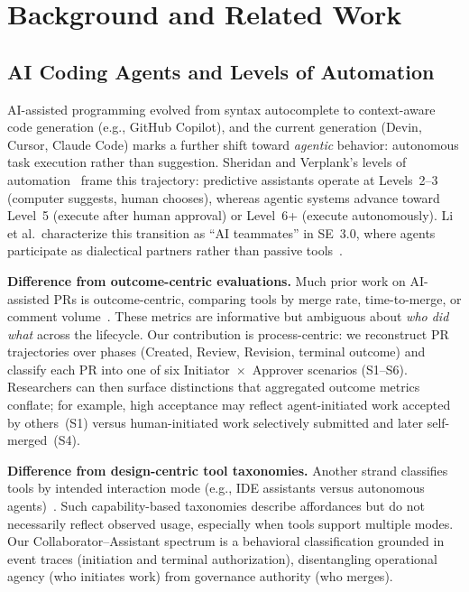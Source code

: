 \documentclass[sigconf]{acmart}
\begin{document}
\section{Background and Related Work}
\label{sec:background}

\subsection{AI Coding Agents and Levels of Automation}

AI-assisted programming evolved from syntax autocomplete to
context-aware code generation (e.g., GitHub Copilot), and the
current generation (Devin, Cursor, Claude Code) marks a further
shift toward \emph{agentic} behavior: autonomous task execution
rather than suggestion.
Sheridan and Verplank's levels of automation~\cite{sheridan1978human}
frame this trajectory: predictive assistants operate at
Levels~2--3 (computer suggests, human chooses), whereas agentic
systems advance toward Level~5 (execute after human approval) or
Level~6+ (execute autonomously).
Li et al.\ characterize this transition as ``AI teammates'' in
SE~3.0, where agents participate as dialectical partners rather
than passive tools~\cite{li2025aiteammates}.

\textbf{Difference from outcome-centric evaluations.}
Much prior work on AI-assisted PRs is outcome-centric, comparing
tools by merge rate, time-to-merge, or comment
volume~\cite{li2025aidev,pinna2026comparing,rahman2026tasklevel}.
These metrics are informative but ambiguous about \emph{who did
what} across the lifecycle.
Our contribution is process-centric: we reconstruct PR
trajectories over phases (Created, Review, Revision, terminal
outcome) and classify each PR into one of six
Initiator~$\times$~Approver scenarios (S1--S6).
Researchers can then surface distinctions that aggregated outcome
metrics conflate; for example, high acceptance may reflect
agent-initiated work accepted by others~(S1) versus
human-initiated work selectively submitted and later
self-merged~(S4).

\textbf{Difference from design-centric tool taxonomies.}
Another strand classifies tools by intended interaction mode
(e.g., IDE assistants versus autonomous
agents)~\cite{li2025aiteammates,agarwal2026ai}.
Such capability-based taxonomies describe affordances but do not
necessarily reflect observed usage, especially when tools support
multiple modes.
Our Collaborator--Assistant spectrum is a behavioral
classification grounded in event traces (initiation and terminal
authorization), disentangling operational agency (who initiates
work) from governance authority (who merges).
\end{document}
